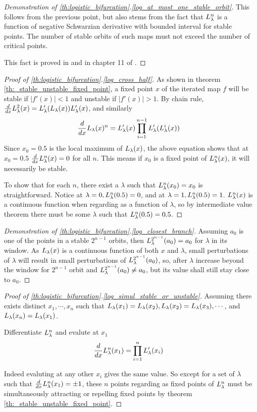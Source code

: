 \begin{proof}[Demonstration of \ref{th:logistic_bifurcation}.\ref{log_at_most_one_stable_orbit}]
	This follows from the previous point, but also stems from the fact that $L_{\lambda}^n$ is a function of negative Schwarzian derivative with bounded interval for stable points.
	The number of stable orbits of such maps must not exceed the number of critical points.

	This fact is proved in \cite{Pierre_Collet} and in chapter 11 of \cite{Devaney_green_book_chaos_definition}.
\end{proof}


\begin{proof}[Proof of \ref{th:logistic_bifurcation}.\ref{log_cross_half}]
	As shown in theorem \ref{th:_stable_unstable_fixed_point}, a fixed point $x$ of the iterated map $f$ will be stable if $|f'(x)| < 1$ and unstable if $|f'(x)| > 1$.
	By chain rule, 
	$\frac{d}{dx}L_{\lambda}^2 (x) = L_{\lambda}'(L_{\lambda}(x))L_{\lambda}'(x)$, and similarly
	$$
		\frac{d}{dx} L_{\lambda}(x)^n = L_{\lambda}'(x)\prod_{i=1}^{n-1} L_{\lambda}'(L_{\lambda}^i(x))
	$$
	Since $x_0 = 0.5$ is the local maximum of $L_{\lambda}(x)$, the above equation shows that at $x_0 = 0.5$ $\frac{d}{dx} L_{\lambda}^n(x) = 0$ for all $n$.
	This means if $x_0$ is a fixed point of $L_{\lambda}^n(x)$, it will necessarily be stable. 
	
	To show that for each $n$, there exist a $\lambda$ such that $L_{\lambda}^n(x_0) = x_0$ is straightforward. 
	Notice at $\lambda = 0, L_{\lambda}^n(0.5) = 0$, and at $\lambda = 1, L_{\lambda}^n(0.5) = 1$.
	$L_{\lambda}^n(x)$ is a continuous function when regarding as a function of $\lambda$, so by intermediate value theorem there must be some $\lambda$ such that $L_{\lambda}^n(0.5) = 0.5$.
\end{proof}

\begin{proof}[Demonstration of \ref{th:logistic_bifurcation}.\ref{log_closest_branch}]
	Assuming $a_0$ is one of the points in a stable $2^{n-1}$ orbits, then $L_{\lambda}^{2^{n-1}}(a_0)=a_0$ for $\lambda$ in its window.
	As $L_{\lambda}(x)$ is a continuous function of both $x$ and $\lambda$, small perturbations of $\lambda$ will result in small perturbations of $L_{\lambda}^{2^{n-1}}(a_0)$, so, after $\lambda$ increase beyond the window for $2^{n-1}$ orbit and $L_{\lambda}^{2^{n-1}}(a_0) \neq a_0$, but its value shall still stay close to $a_0$.
\end{proof}

\begin{proof}[Proof of \ref{th:logistic_bifurcation}.\ref{log_simul_stable_or_unstable}]
		Assuming there exists distinct $x_1, \cdots, x_n$ such that $L_{\lambda}(x_1) = L_{\lambda}(x_2), L_{\lambda}(x_2) = L_{\lambda}(x_3), \cdots $, and $L_{\lambda}(x_n) = L_{\lambda}(x_1)$.

		Differentiate $L_{\lambda}^n$ and evalute at $x_1$ 
		$$
		\frac{d}{dx} L_{\lambda}^n(x_1) = \prod_{i=1}^n L_{\lambda}'(x_i)
		$$

		Indeed evaluting at any other $x_i$ gives the same value. 
		So except for a set of $\lambda$ such that $\frac{d}{dx} L_{\lambda}^n(x_1) = \pm 1$, these $n$ points regarding as fixed points of $L_{\lambda}^n$ must be simultaneously attracting or repelling fixed points by theorem \ref{th:_stable_unstable_fixed_point}.
\end{proof}

